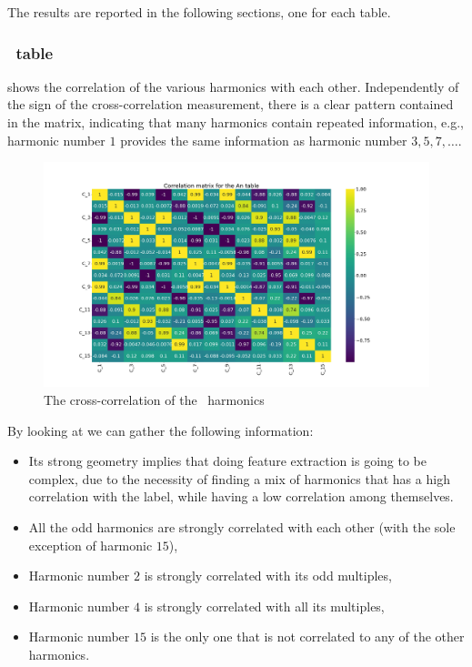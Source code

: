 The results are reported in the following sections, one for each table.

\subsubsection{\an\ table}
 shows the correlation of the various harmonics with each other. Independently
of the sign of the cross-correlation measurement, there is a clear pattern contained in the matrix,
indicating that many harmonics contain repeated information, e.g., harmonic number $1$ provides the same information as harmonic number $3, 5, 7, \ldots$.
\begin{figure}
	\centering
	\includegraphics[width=\linewidth]{img/An_corr_matrix.png}
	\caption{The cross-correlation of the \an\ harmonics} \label{fig:an-corr}
\end{figure}

By looking at  we can gather the following information:
\begin{itemize}
	\item Its strong geometry implies that doing feature extraction is going to be complex, due to the necessity of finding a mix of harmonics that has a high correlation with the label, while having a low correlation among themselves.
	\item All the odd harmonics are strongly correlated with each other (with the sole exception
	      of harmonic $15$),
	\item Harmonic number $2$ is strongly correlated with its odd multiples,
	\item Harmonic number $4$ is strongly correlated with all its multiples,
	\item Harmonic number $15$ is the only one that is not correlated to any of the other
	      harmonics.
\end{itemize}

